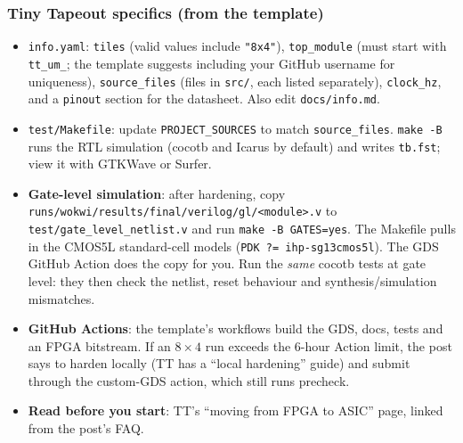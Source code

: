\subsubsection{Tiny Tapeout specifics (from the template)}
\begin{itemize}
  \item \texttt{info.yaml}: \texttt{tiles} (valid values include
    \texttt{"8x4"}), \texttt{top\_module} (must start with \texttt{tt\_um\_};
    the template suggests including your GitHub username for uniqueness),
    \texttt{source\_files} (files in \texttt{src/}, each listed
    separately), \texttt{clock\_hz}, and a \texttt{pinout} section for the
    datasheet. Also edit \texttt{docs/info.md}.
  \item \texttt{test/Makefile}: update \texttt{PROJECT\_SOURCES} to match
    \texttt{source\_files}. \texttt{make -B} runs the RTL simulation (cocotb
    and Icarus by default) and writes \texttt{tb.fst}; view it with GTKWave
    or Surfer.
  \item \textbf{Gate-level simulation}: after hardening, copy
    \nolinkurl{runs/wokwi/results/final/verilog/gl/<module>.v} to
    \texttt{test/gate\_level\_netlist.v} and run \texttt{make -B GATES=yes}.
    The Makefile pulls in the CMOS5L standard-cell models
    (\texttt{PDK ?= ihp-sg13cmos5l}). The GDS GitHub Action does the copy
    for you. Run the \emph{same} cocotb tests at gate level: they then check
    the netlist, reset behaviour and synthesis/simulation mismatches.
  \item \textbf{GitHub Actions}: the template's workflows build the GDS,
    docs, tests and an FPGA bitstream. If an $8\times4$ run exceeds the
    6-hour Action limit, the post says to harden locally (TT has a
    ``local hardening'' guide) and submit through the custom-GDS action,
    which still runs precheck.
  \item \textbf{Read before you start}: TT's ``moving from FPGA to ASIC''
    page, linked from the post's FAQ.
\end{itemize}

